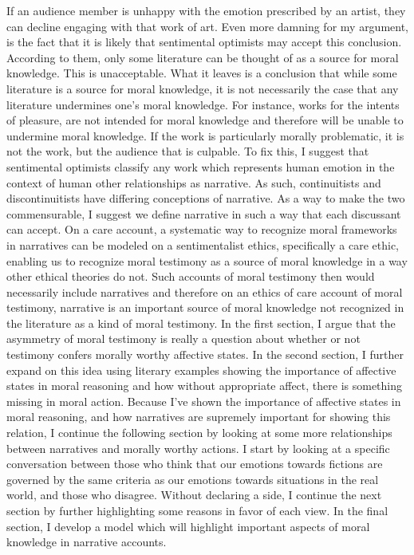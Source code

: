 \documentclass[
  letterpaper,
  DIV=11,
  numbers=noendperiod]{scrartcl}
\theoremstyle{remark}
\begin{document}
If an audience member is unhappy with the emotion prescribed by an
artist, they can decline engaging with that work of art. Even more
damning for my argument, is the fact that it is likely that sentimental
optimists may accept this conclusion. According to them, only some
literature can be thought of as a source for moral knowledge. This is
unacceptable. What it leaves is a conclusion that while some literature
is a source for moral knowledge, it is not necessarily the case that any
literature undermines one's moral knowledge. For instance, works for the
intents of pleasure, are not intended for moral knowledge and therefore
will be unable to undermine moral knowledge. If the work is particularly
morally problematic, it is not the work, but the audience that is
culpable. To fix this, I suggest that sentimental optimists classify any
work which represents human emotion in the context of human other
relationships as narrative. As such, continuitists and discontinuitists
have differing conceptions of narrative. As a way to make the two
commensurable, I suggest we define narrative in such a way that each
discussant can accept. On a care account, a systematic way to recognize
moral frameworks in narratives can be modeled on a sentimentalist
ethics, specifically a care ethic, enabling us to recognize moral
testimony as a source of moral knowledge in a way other ethical theories
do not. Such accounts of moral testimony then would necessarily include
narratives and therefore on an ethics of care account of moral
testimony, narrative is an important source of moral knowledge not
recognized in the literature as a kind of moral testimony. In the first
section, I argue that the asymmetry of moral testimony is really a
question about whether or not testimony confers morally worthy affective
states. In the second section, I further expand on this idea using
literary examples showing the importance of affective states in moral
reasoning and how without appropriate affect, there is something missing
in moral action. Because I've shown the importance of affective states
in moral reasoning, and how narratives are supremely important for
showing this relation, I continue the following section by looking at
some more relationships between narratives and morally worthy actions. I
start by looking at a specific conversation between those who think that
our emotions towards fictions are governed by the same criteria as our
emotions towards situations in the real world, and those who disagree.
Without declaring a side, I continue the next section by further
highlighting some reasons in favor of each view. In the final section, I
develop a model which will highlight important aspects of moral
knowledge in narrative accounts.

\newpage
\end{document}
